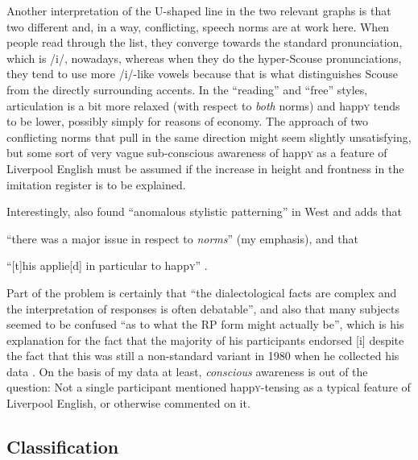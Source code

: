 Another interpretation of the U-shaped line in the two relevant graphs is that two different and, in a way, conflicting, speech norms are at work here.
When people read through the list, they converge towards the standard pronunciation, which is /i/, nowadays, whereas when they do the hyper-Scouse pronunciations, they tend to use more /i/-like vowels because that is what distinguishes Scouse from the directly surrounding accents.
In the ``reading'' and ``free'' styles, articulation is a bit more relaxed (with respect to \emph{both} norms) and happ\textsc{y} tends to be lower, possibly simply for reasons of economy.
The approach of two conflicting norms that pull in the same direction might seem slightly unsatisfying, but some sort of very vague sub-conscious awareness of happ\textsc{y} as a feature of Liverpool English must be assumed if the increase in height and frontness in the imitation register is to be explained.

Interestingly, \textcite[102]{newbrook1999} also found ``anomalous stylistic patterning'' in West  and adds that 
\begin{inparaenum}[(a)]
	\item ``there was a major issue in respect to \emph{norms}'' (my emphasis), and that
	\item ``[t]his applie[d] in particular to happ\textsc{y}'' \parencite[102]{newbrook1999}.
\end{inparaenum}
Part of the problem is certainly that ``the dialectological facts are complex and the interpretation of responses is often debatable'', and also that many subjects seemed to be confused ``as to what the RP form might actually be'', which is his explanation for the fact that the majority of his participants endorsed [i] despite the fact that this was still a non-standard variant in 1980 when he collected his data \parencite[101]{newbrook1999}.
On the basis of my data at least, \emph{conscious} awareness is out of the question: Not a single participant mentioned happ\textsc{y}-tensing as a typical feature of Liverpool English, or otherwise commented on it.

\subsection{Classification}
\label{prod.disc.happy.classification}

